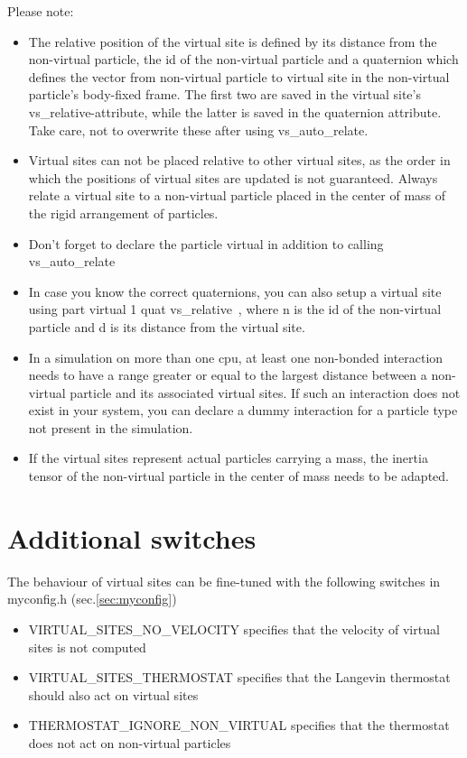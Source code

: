 Please note:
\begin{itemize}
\item The relative position of the virtual site is defined by its distance from the non-virtual particle, the id of the non-virtual particle and a quaternion which defines the vector from non-virtual particle to virtual site in the non-virtual particle's body-fixed frame. The first two are saved in the virtual site's vs\_relative-attribute, while the latter is saved in the quaternion attribute. Take care, not to overwrite these after using vs\_auto\_relate.
\item Virtual sites can not be placed relative to other virtual sites, as the order in which the positions of virtual sites are updated is not guaranteed. Always relate a virtual site to a non-virtual particle placed in the center of mass of the rigid arrangement of particles.
\item Don't forget to declare the particle virtual in addition to calling vs\_auto\_relate
\item In case you know the correct quaternions, you can also setup a virtual site using\newline
part  virtual 1 quat  vs\_relative  \,,\newline
where n is the id of the non-virtual particle and d is its distance from the virtual site.
\item In a simulation on more than one cpu, at least one non-bonded interaction needs to have a range greater or equal to the largest distance between a non-virtual particle and its associated virtual sites. If such an interaction does not exist in your system, you can declare a dummy interaction for a particle type not present in the simulation.
\item If the virtual sites represent actual particles carrying a mass, the inertia tensor of the non-virtual particle in the center of mass needs to be adapted.
\end{itemize}

\section{Additional switches}

The behaviour of virtual sites can be fine-tuned with the following switches in myconfig.h (sec.\ref{sec:myconfig})
\begin{itemize}
\item VIRTUAL_SITES_NO_VELOCITY specifies that the velocity of virtual sites is not computed
\item VIRTUAL_SITES_THERMOSTAT specifies that the Langevin thermostat should also act on virtual sites
\item THERMOSTAT_IGNORE_NON_VIRTUAL specifies that the thermostat does not act on non-virtual particles
\end{itemize}

